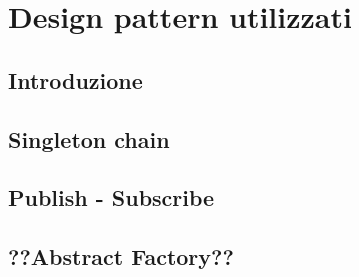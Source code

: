 \newpage
\section{Design pattern utilizzati}

\subsection{Introduzione}

\subsection{Singleton chain}

\subsection{Publish - Subscribe}

\subsection{??Abstract Factory??}
